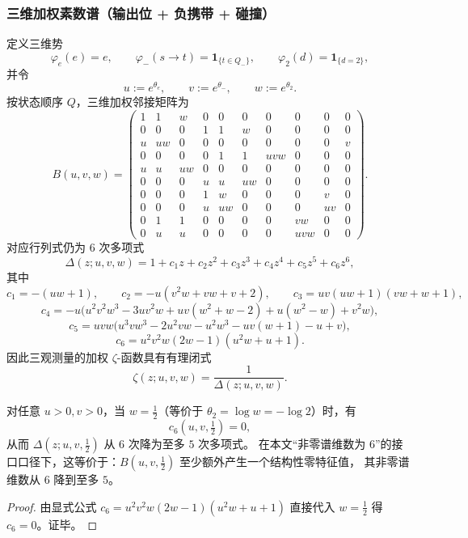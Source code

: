 \subsubsection{三维加权素数谱（输出位 + 负携带 + 碰撞）}
定义三维势
\[
\varphi_e(e)=e,\qquad
\varphi_-(s\to t)=\mathbf{1}_{\{t\in Q_-\}},\qquad
\varphi_2(d)=\mathbf{1}_{\{d=2\}},
\]
并令
\[
u:=e^{\theta_e},\qquad v:=e^{\theta_-},\qquad w:=e^{\theta_2}.
\]
按状态顺序 $Q$，三维加权邻接矩阵为
\[
B(u,v,w)=
\begin{pmatrix}
1 & 1 & w & 0 & 0 & 0 & 0 & 0 & 0 & 0\\
0 & 0 & 0 & 1 & 1 & w & 0 & 0 & 0 & 0\\
u & uw & 0 & 0 & 0 & 0 & 0 & 0 & 0 & v\\
0 & 0 & 0 & 0 & 1 & 1 & uvw & 0 & 0 & 0\\
u & u & uw & 0 & 0 & 0 & 0 & 0 & 0 & 0\\
0 & 0 & 0 & u & u & uw & 0 & 0 & 0 & 0\\
0 & 0 & 0 & 1 & w & 0 & 0 & 0 & v & 0\\
0 & 0 & 0 & u & uw & 0 & 0 & 0 & uv & 0\\
0 & 1 & 1 & 0 & 0 & 0 & 0 & vw & 0 & 0\\
0 & u & u & 0 & 0 & 0 & 0 & uvw & 0 & 0
\end{pmatrix}.
\]
对应行列式仍为 6 次多项式
\[
\Delta(z;u,v,w)=1+c_1z+c_2z^2+c_3z^3+c_4z^4+c_5z^5+c_6z^6,
\]
其中
\[
c_1=-(uw+1),\qquad
c_2=-u(v^2w+vw+v+2),\qquad
c_3=uv(uw+1)(vw+w+1),
\]
\[
c_4=-u\bigl(u^2v^2w^3-3uv^2w+uv(w^2+w-2)+u(w^2-w)+v^2w\bigr),
\]
\[
c_5=uvw\bigl(u^3 v w^3-2u^2 v w-u^2 w^3-u v(w+1)-u+v\bigr),
\]
\[
c_6=u^2 v^2 w(2w-1)(u^2w+u+1).
\]
因此三观测量的加权 $\zeta$-函数具有有理闭式
\[
\zeta(z;u,v,w)=\frac{1}{\Delta(z;u,v,w)}.
\]
\begin{proposition}[内部临界超平面 \texorpdfstring{$w=\frac12$}{w=1/2}：有效谱维数的一阶坍缩]\label{prop:sync-kernel-3d-critical-w-half}
对任意 \(u>0,v>0\)，当 \(w=\tfrac12\)（等价于 \(\theta_2=\log w=-\log 2\)）时，有
\[
c_6(u,v,\tfrac12)=0,
\]
从而
\(
\Delta(z;u,v,\tfrac12)
\)
从 \(6\) 次降为至多 \(5\) 次多项式。
在本文“非零谱维数为 \(6\)”的接口口径下，这等价于：\(B(u,v,\tfrac12)\) 至少额外产生一个结构性零特征值，
其非零谱维数从 \(6\) 降到至多 \(5\)。
\end{proposition}
\begin{proof}
由显式公式 \(c_6=u^2v^2w(2w-1)(u^2w+u+1)\) 直接代入 \(w=\tfrac12\) 得 \(c_6=0\)。证毕。
\end{proof}

